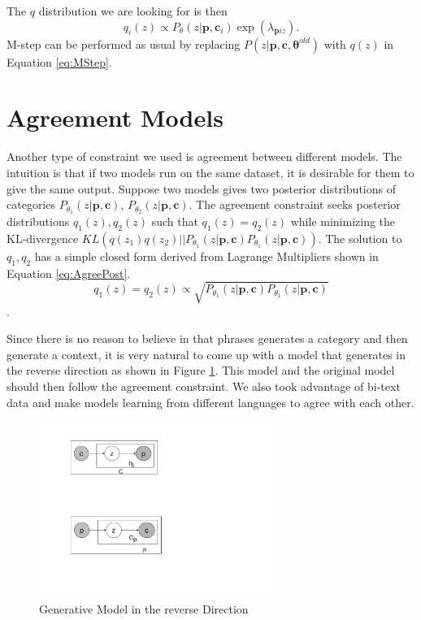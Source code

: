 The $q$ distribution we are looking for is then
\[
q_i(z)\propto P_{\theta}(z|\textbf{p},\textbf{c}_i)
\exp(\lambda_{\textbf{p}iz}).
\]
M-step can be performed as usual by replacing
$P(z|\textbf{p},\textbf{c},
\boldsymbol\theta^{old})$ with 
$q(z)$ in Equation \ref{eq:MStep}.

\section{Agreement Models}\label{sec:pr-agree}

Another type of constraint we used is agreement between
different models. The intuition is that if two models run
on the same dataset, it is desirable for them to give the same 
output. Suppose two models gives two posterior 
distributions of categories
$P_{\theta_1}(z|\textbf{p},\textbf{c})$,
$P_{\theta_2}(z|\textbf{p},\textbf{c})$. The
agreement constraint seeks posterior distributions
$q_1(z),q_2(z)$
such that $q_1(z)=q_2(z)$ while minimizing
the KL-divergence
$KL(q(z_1)q(z_2)||
P_{\theta_1}(z|\textbf{p},\textbf{c})
P_{\theta_1}(z|\textbf{p},\textbf{c}))$.
The solution to $q_1,q_2$ has a simple closed
form derived from Lagrange Multipliers shown in
Equation \ref{eq:AgreePost}.
\begin{equation}\label{eq:AgreePost}
q_1(z)=q_2(z)\propto 
\sqrt{P_{\theta_1}(z|\textbf{p},\textbf{c})
P_{\theta_1}(z|\textbf{p},\textbf{c})}
\end{equation}.

Since there is no reason to believe in that
phrases generates a category and then generate
a context, it is very natural to come up with a model
that generates in the reverse direction
as shown in Figure \ref{fig:EMreverse}. This model
and the original model should then follow the agreement 
constraint.
We also
took advantage of bi-text data and make models
learning from different languages to
agree with each other.

\begin{figure}[h]
  \centering
  \includegraphics[width=3.0in]{pr-clustering/EMreverse}
  \caption{Generative Model in the reverse Direction}
  \label{fig:EMreverse}
\end{figure}

